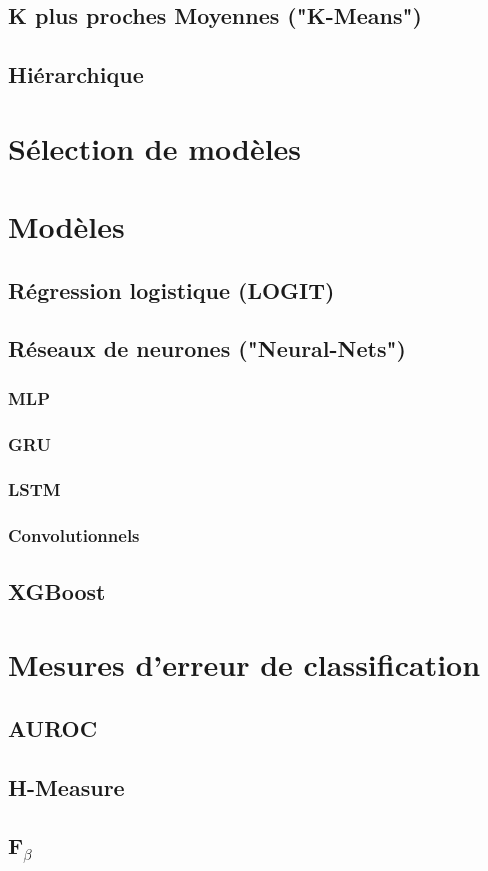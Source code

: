 \documentclass[10pt,letterpaper]{article}
\begin{document}
\subsection{K plus proches Moyennes ("K-Means")}

\subsection{Hiérarchique}


\section{Sélection de modèles}


\section{Modèles}
\subsection{Régression logistique (LOGIT)}

\subsection{Réseaux de neurones ("Neural-Nets")}
\subsubsection{MLP}
\subsubsection{GRU}
\subsubsection{LSTM}
\subsubsection{Convolutionnels}

\subsection{XGBoost}


\section{Mesures d'erreur de classification}
\subsection{AUROC}

\subsection{H-Measure}

\subsection{F\!$_{\beta}$}
\end{document}
